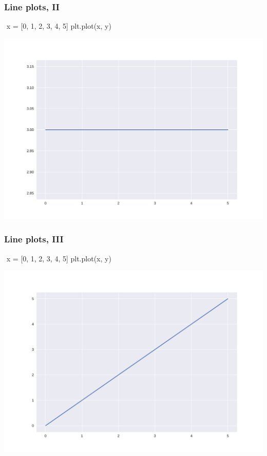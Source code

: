 \documentclass[english,serif,mathserif,xcolor=pdftex,dvipsnames,table]{beamer}
\begin{document}
\begin{frame}[fragile]
  \frametitle{Line plots, II}
\begin{semiverbatim}\small
\In \,\,x = [0, 1, 2, 3, 4, 5]
\In {}
\In plt.plot(x, y)
\end{semiverbatim}
  \begin{center}
    \includegraphics[height=0.66\textheight]{fig/lineplot0.pdf}
  \end{center}
\end{frame}


\begin{frame}[fragile]
  \frametitle{Line plots, III}
\begin{semiverbatim}\small
\In \,\,x = [0, 1, 2, 3, 4, 5]
\In {}
\In plt.plot(x, y)
\end{semiverbatim}
  \begin{center}
    \includegraphics[height=0.66\textheight]{fig/lineplot1.pdf}
  \end{center}
\end{frame}
\end{document}
